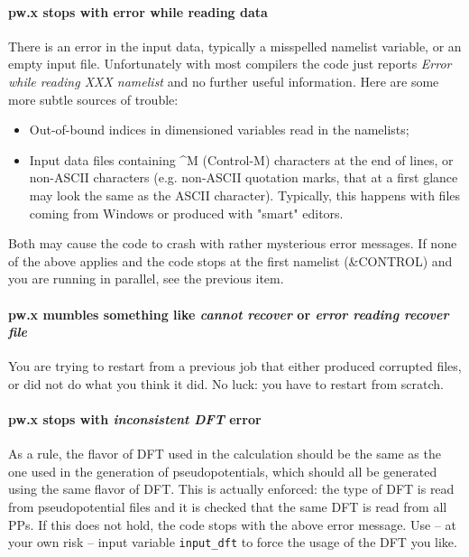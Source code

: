 \documentclass[12pt,a4paper]{article}
\begin{document}
\paragraph{pw.x stops with error while reading data}
There is an error in the input data, typically a misspelled namelist 
variable, or an empty input file.
Unfortunately with most compilers the code just reports {\em Error while
reading XXX namelist} and no further useful information.
Here are some more subtle sources of trouble:
\begin{itemize}
\item Out-of-bound indices in dimensioned variables read in the namelists;
\item Input data files containing \^{}M (Control-M) characters at the end
  of lines, or non-ASCII characters (e.g. non-ASCII quotation marks,
  that at a first glance may look the same as the ASCII
  character). Typically, this happens with files coming from Windows
  or produced with "smart" editors.  
\end{itemize}
Both may cause the code to crash with rather mysterious error messages.
If none of the above applies and the code stops at the first namelist
(\&CONTROL) and you are running in parallel, see the previous item.

\paragraph{pw.x mumbles something like {\em cannot recover} or 
{\em error reading recover file}} 
You are trying to restart from a previous job that either
produced corrupted files, or did not do what you think it did. No luck: you
have to restart from scratch.

\paragraph{pw.x stops with {\em inconsistent DFT} error}
As a rule, the flavor of DFT used in the calculation should be the
same as the one used in the generation of pseudopotentials, which
should all be generated using the same flavor of DFT. This is actually enforced: the
type of DFT is read from pseudopotential files and it is checked that the same DFT
is read from all PPs. If this does not hold, the code stops with the
above error message. Use -- at your own risk -- input variable 
\texttt{input\_dft} to force the usage of the DFT you like.
\end{document}
